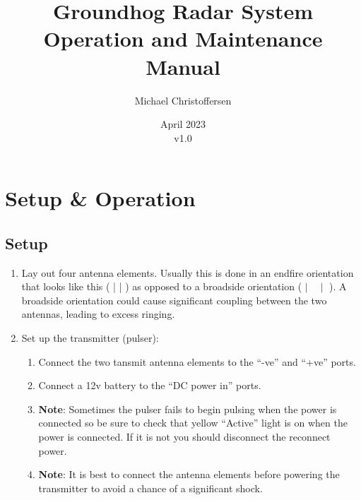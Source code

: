 \documentclass[titlepage]{article}
\title{\Huge Groundhog Radar System Operation and Maintenance Manual}
\author{\LARGE Michael Christoffersen}
\date{\LARGE April 2023\\v1.0}
\begin{document}
\maketitle

\tableofcontents

\pagebreak

\section{Setup \& Operation}
\subsection{Setup}
\begin{enumerate}
    \item Lay out four antenna elements. Usually this is done in an endfire orientation that looks like this ( | | ) as opposed to a broadside orientation ( $\mid \hspace{1em} \mid$ ). A broadside orientation could cause significant coupling between the two antennas, leading to excess ringing.
    \item Set up the transmitter (pulser):
    \begin{enumerate}
        \item Connect the two tansmit antenna elements to the ``-ve'' and ``+ve'' ports.
        \item Connect a 12v battery to the ``DC power in'' ports.
        \item \textbf{Note}: Sometimes the pulser fails to begin pulsing when the power is connected so be sure to check that yellow ``Active'' light is on when the power is connected. If it is not you should disconnect the reconnect power.
        \item \textbf{Note}: It is best to connect the antenna elements before powering the transmitter to avoid a chance of a significant shock.
    \end{enumerate}
    

\end{enumerate}
\end{document}
